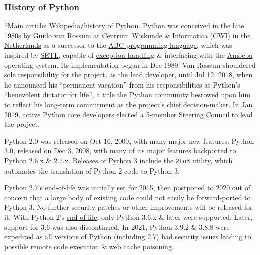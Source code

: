 \documentclass{article}
\numberwithin{equation}{section}
\begin{document}
\subsubsection{History of Python}
``Main article: \href{https://en.wikipedia.org/wiki/History_of_Python}{Wikipedia\texttt{/}history of Python}. Python was conceived in the late 1980s by \href{https://en.wikipedia.org/wiki/Guido_van_Rossum}{Guido van Rossum} at \href{https://en.wikipedia.org/wiki/Centrum_Wiskunde_%26_Informatica}{Centrum Wiskunde \& Informatica} (CWI) in the \href{https://en.wikipedia.org/wiki/Netherlands}{Netherlands} as a successor to the \href{https://en.wikipedia.org/wiki/ABC_(programming_language)}{ABC programming language}, which was inspired by \href{https://en.wikipedia.org/wiki/SETL}{SETL}, capable of \href{https://en.wikipedia.org/wiki/Exception_handling}{exception handling} \& interfacing with the \href{https://en.wikipedia.org/wiki/Amoeba_(operating_system)}{Amoeba} operating system. Its implementation began in Dec 1989. Van Rossum shouldered sole responsibility for the project, as the lead developer, until Jul 12, 2018, when he announced his ``permanent vacation'' from his responsibilities as Python's ``\href{https://en.wikipedia.org/wiki/Benevolent_dictator_for_life}{benevolent dictator for life}'', a title the Python community bestowed upon him to reflect his long-term commitment as the project's chief decision-maker. In Jan 2019, active Python core developers elected a 5-member Steering Council to lead the project.

Python 2.0 was released on Oct 16, 2000, with many major new features. Python 3.0, released on Dec 3, 2008, with many of its major features \href{https://en.wikipedia.org/wiki/Backporting}{backported} to Python 2.6.x \& 2.7.x. Releases of Python 3 include the \texttt{2to3} utility, which automates the translation of Python 2 code to Python 3.

Python 2.7's \href{https://en.wikipedia.org/wiki/End-of-life_(product)}{end-of-life} was initially set for 2015, then postponed to 2020 out of concern that a large body of existing code could not easily be forward-ported to Python 3. No further security patches or other improvements will be released for it. With Python 2's \href{https://en.wikipedia.org/wiki/End-of-life_(product)}{end-of-life}, only Python 3.6.x \& later were supported. Later, support for 3.6 was also discontinued. In 2021, Python 3.9.2 \& 3.8.8 were expedited as all versions of Python (including 2.7) had security issues leading to possible \href{https://en.wikipedia.org/wiki/Remote_code_execution}{remote code execution} \& \href{https://en.wikipedia.org/wiki/Cache_poisoning}{web cache poisoning}.
\end{document}
